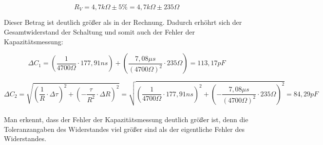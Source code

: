 \[
	R_{V} = 4,7 k\Omega \pm 5\% = 4,7 k\Omega \pm 235 \Omega
\]

Dieser Betrag ist deutlich größer als in der Rechnung.
Dadurch erhöhrt sich der Gesamtwiderstand der Schaltung und somit
auch der Fehler der Kapazitätsmessung:

\[
	\Delta C_{1} = (\frac{1}{4700 \Omega} \cdot 177,91 ns) + (\frac{7,08 \mu s}{(4700 \Omega)^2} \cdot 235 \Omega)
	= 113,17 pF
\]

\[
	\Delta C_{2} = \sqrt{(\frac{1}{R} \cdot \Delta \tau)^2 + (- \frac{\tau}{R^2} \cdot \Delta R)^2} =
	\sqrt{(\frac{1}{4700 \Omega} \cdot 177,91 ns)^2 + (- \frac{7,08 \mu s}{(4700 \Omega)^2} \cdot 235 \Omega)^2}
	= 84,29 pF
\]\\

Man erkennt, dass der Fehler der Kapazitätsmessung deutlich größer ist,
denn die Toleranzangaben des Widerstandes viel größer sind als der
eigentliche Fehler des Widerstandes. 